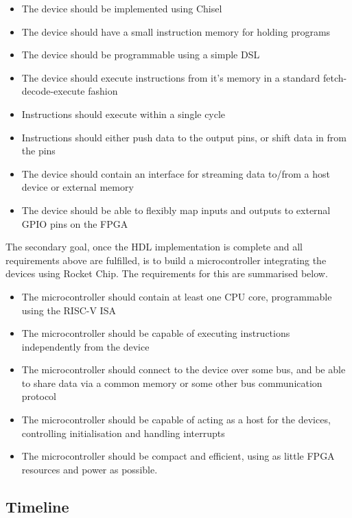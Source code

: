 \documentclass[a4paper,fleqn,12pt]{article}
\begin{document}
\begin{itemize}
    \item The device should be implemented using Chisel
    \item The device should have a small instruction memory for holding programs
    \item The device should be programmable using a simple DSL
    \item The device should execute instructions from it's memory in a standard fetch-decode-execute fashion
    \item Instructions should execute within a single cycle
    \item Instructions should either push data to the output pins, or shift data in from the pins
    \item The device should contain an interface for streaming data to/from a host device or external memory
    \item The device should be able to flexibly map inputs and outputs to external GPIO pins on the FPGA
\end{itemize}

The secondary goal, once the HDL implementation is complete and all requirements above are fulfilled, is to build a microcontroller integrating the devices using Rocket Chip. The requirements for this are summarised below.

\begin{itemize}
    \item The microcontroller should contain at least one CPU core, programmable using the RISC-V ISA
    \item The microcontroller should be capable of executing instructions independently from the device
    \item The microcontroller should connect to the device over some bus, and be able to share data via a common memory or some other bus communication protocol
    \item The microcontroller should be capable of acting as a host for the devices, controlling initialisation and handling interrupts
    \item The microcontroller should be compact and efficient, using as little FPGA resources and power as possible.
\end{itemize}

\subsection{Timeline}
\label{sec:timeline}
\end{document}

